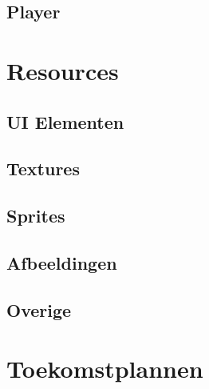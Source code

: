 \documentclass{report}
\begin{document}

  \section{Player} %
  \label{sec:player}


\chapter{Resources} %
\label{cha:resources}

  \section{UI Elementen} %
  \label{sec:ui_elementen}


  \section{Textures} %
  \label{sec:textures}


  \section{Sprites} %
  \label{sec:sprites}


  \section{Afbeeldingen} %
  \label{sec:afbeeldingen}


  \section{Overige} %
  \label{sec:overige}


\chapter{Toekomstplannen} %
\label{cha:toekomstplannen}

\end{document}
